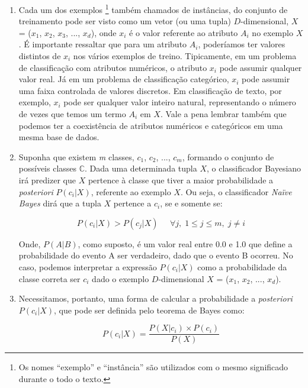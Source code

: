 \begin{enumerate}
    \item Cada um dos exemplos \footnote{Os nomes ``exemplo'' e ``instância'' são utilizados com o mesmo significado durante o todo o texto.} também chamados de instâncias, do conjunto de treinamento pode ser visto como um vetor (ou uma tupla) $D$-dimensional, $X$ = ($x_1$, $x_2$, $x_3$, ..., $x_d$), onde $x_i$ é o valor referente ao atributo $A_i$ no exemplo $X$. É importante ressaltar que para um atributo $A_i$, poderíamos ter valores distintos de $x_i$ nos vários exemplos de treino. Tipicamente, em um problema de classificação com atributos numéricos, o atributo $x_i$ pode assumir qualquer valor real. Já em um problema de classificação categórico, $x_i$ pode assumir uma faixa controlada de valores discretos. Em classificação de texto, por exemplo, $x_i$ pode ser qualquer valor inteiro natural, representando o número de vezes que temos um termo $A_i$ em $X$. Vale a pena lembrar também que podemos ter a coexistência de atributos numéricos e categóricos em uma mesma base de dados.
    

    \item Suponha que existem \textit{m} classes, $c_1$, $c_2$, ..., $c_\textit{m}$, formando o conjunto de possíveis classes $\mathbb{C}$. Dada uma determinada tupla $X$, o classificador Bayesiano irá predizer que $X$ pertence à classe que tiver a maior probabilidade a \textit{posteriori} $P(c_i|X)$, referente ao exemplo $X$. Ou seja, o classificador \textit{Naïve Bayes} dirá que a tupla $X$ pertence a $c_i$, se e somente se:
        
\begin{equation}\label{eqn::max_pcgivenx}
   P(c_{i}|X) > P(c_{j}|X) \;\;\;\;\;\forall j,\; 1 \le j \le m, \; j \not= i
\end{equation}

Onde, $P(A|B)$, como suposto, é um valor real entre 0.0 e 1.0 que define a probabilidade do evento A ser verdadeiro, dado que o evento B ocorreu. No caso, podemos interpretar a expressão $P(c_i|X)$ como a probabilidade da classe correta ser $c_i$ dado o exemplo $D$-dimensional $X$ = ($x_1$, $x_2$, ..., $x_d$).

    \item Necessitamos, portanto, uma forma de calcular a probabilidade a \textit{posteriori} $P(c_i| X)$, que pode ser definida pelo teorema de Bayes como:
 
\begin{equation}\label{eqn::bayes}
   P(c_{i}|X) = \frac{P(X|c_i) \times P(c_i) }{P(X)}
\end{equation}


\end{enumerate}
